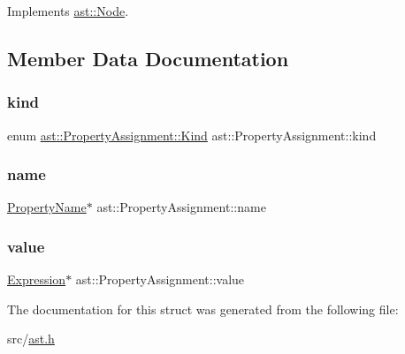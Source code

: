 Implements \hyperlink{structast_1_1_node_abc089ee6caaf06a4445ebdd8391fdebc}{ast\+::\+Node}.



\subsection{Member Data Documentation}
\mbox{\label{structast_1_1_property_assignment_a9412f5914291d3be87b4bba0b91e08f7}} 
\subsubsection{\texorpdfstring{kind}{kind}}
{\footnotesize\ttfamily enum \hyperlink{structast_1_1_property_assignment_a33441184223429a4876fd968c4f63a97}{ast\+::\+Property\+Assignment\+::\+Kind}  ast\+::\+Property\+Assignment\+::kind}

\mbox{\label{structast_1_1_property_assignment_ade359a883741e5dfec19d48f1eb5d060}} 
\subsubsection{\texorpdfstring{name}{name}}
{\footnotesize\ttfamily \hyperlink{structast_1_1_property_name}{Property\+Name}$\ast$ ast\+::\+Property\+Assignment\+::name}

\mbox{\label{structast_1_1_property_assignment_aa7325aea8709dfe9b310c6942604efd6}} 
\subsubsection{\texorpdfstring{value}{value}}
{\footnotesize\ttfamily \hyperlink{structast_1_1_expression}{Expression}$\ast$ ast\+::\+Property\+Assignment\+::value}



The documentation for this struct was generated from the following file\+:\begin{DoxyCompactItemize}
\item 
src/\hyperlink{ast_8h}{ast.\+h}\end{DoxyCompactItemize}
